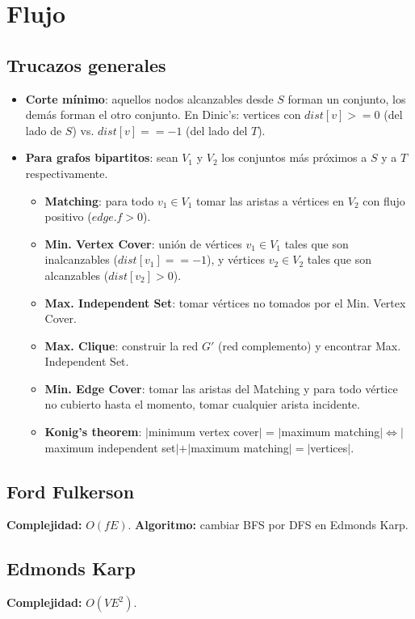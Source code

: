 {\section{Flujo}%
\subsection{Trucazos generales}
\begin{itemize}
\item \textbf{Corte mínimo}: aquellos nodos alcanzables desde $S$ forman un conjunto, los demás forman el otro conjunto.
En Dinic's: vertices con $dist[v] >= 0$ (del lado de $S$) vs.  $dist[v] == -1$ (del lado del $T$).
\item \textbf{Para grafos bipartitos}: sean $V_1$ y $V_2$ los conjuntos más próximos a $S$ y a $T$ respectivamente.
	\begin{itemize}
	\item \textbf{Matching}: para todo $v_1 \in V_1$ tomar las aristas a vértices en $V_2$ con flujo positivo ($edge.f > 0$).
	\item \textbf{Min. Vertex Cover}: unión de vértices $v_1 \in V_1$ tales que son inalcanzables ($dist[v_1] == -1$),
	y vértices $v_2 \in V_2$ tales que son alcanzables ($dist[v_2] > 0$).
	\item \textbf{Max. Independent Set}: tomar vértices no tomados por el Min. Vertex Cover.
	\item \textbf{Max. Clique}: construir la red $G'$ (red complemento) y encontrar Max. Independent Set.
	\item \textbf{Min. Edge Cover}: tomar las aristas del Matching y para todo vértice no cubierto hasta el momento, 
	tomar cualquier arista incidente.
    \item \textbf{Konig's theorem}: $|$minimum vertex cover$|$ = $|$maximum matching$| \Leftrightarrow |$maximum independent set$| + |$maximum matching$| = |$vertices$|$.\\
	\end{itemize}
\end{itemize}

\subsection{Ford Fulkerson}
\textbf{Complejidad: } $O(fE)$.
\textbf{Algoritmo: } cambiar BFS por DFS en Edmonds Karp.

\subsection{Edmonds Karp}
\textbf{Complejidad: } $O(VE^2)$.

}
